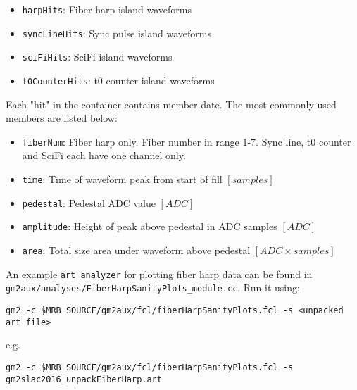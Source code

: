 \begin{itemize}
\item \verb+harpHits+: Fiber harp island waveforms
\item \verb+syncLineHits+: Sync pulse island waveforms
\item \verb+sciFiHits+: SciFi island waveforms
\item \verb+t0CounterHits+: t0 counter island waveforms
\end{itemize}

Each "hit" in the container contains member date. The most commonly used members are listed below:

\begin{itemize}
\item \verb+fiberNum+: Fiber harp only. Fiber number in range 1-7. Sync line, t0 counter and SciFi each have one channel only.
\item \verb+time+: Time of waveform peak from start of fill $[samples]$
\item \verb+pedestal+: Pedestal ADC value $[ADC]$
\item \verb+amplitude+: Height of peak above pedestal in ADC samples $[ADC]$
\item \verb+area+: Total size area under waveform above pedestal $[ADC \times samples]$
\end{itemize}

An example \verb+art analyzer+ for plotting fiber harp data can be found in \verb+gm2aux/analyses/FiberHarpSanityPlots_module.cc+. Run it using:
%
\begin{Verbatim}[frame=single]
gm2 -c $MRB_SOURCE/gm2aux/fcl/fiberHarpSanityPlots.fcl -s <unpacked art file>
\end{Verbatim}
%

e.g.

%
\begin{Verbatim}[frame=single]
gm2 -c $MRB_SOURCE/gm2aux/fcl/fiberHarpSanityPlots.fcl -s gm2slac2016_unpackFiberHarp.art
\end{Verbatim}
%







